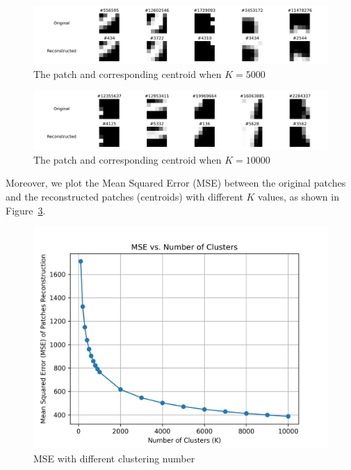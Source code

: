 \documentclass{article}
\begin{document}
\begin{figure}[htbp!]
    \centering
    \includegraphics[width = 0.9 \textwidth]{../Result/Patches/5000-clusters-reconstruction.png}
    \caption{The patch and corresponding centroid when $K = 5000$}
    \label{fig:patches-5000}
\end{figure}


\begin{figure}[htbp!]
    \centering
    \includegraphics[width = 0.9 \textwidth]{../Result/Patches/10000-clusters-reconstruction.png}
    \caption{The patch and corresponding centroid when $K = 10000$}
    \label{fig:patches-10000}
\end{figure}

Moreover, we plot the Mean Squared Error (MSE) between the original patches and the reconstructed patches (centroids) with different $K$ values, as shown in Figure~\ref{fig:mse-k}.

\begin{figure}[htbp!]
    \centering
    \includegraphics[width = 0.6 \textwidth]{../Result/Patches/MSE_vs_K.png}
    \caption{MSE with different clustering number}
    \label{fig:mse-k}
\end{figure}
\end{document}
